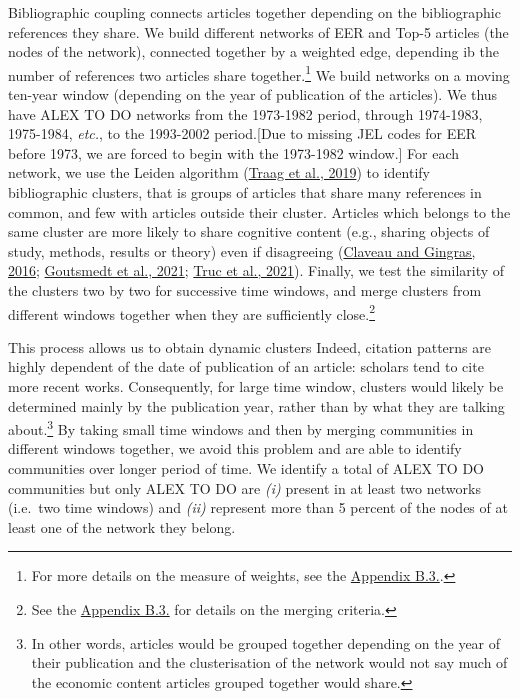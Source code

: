 \documentclass[]{elsarticle} %
\begin{document}
Bibliographic coupling connects articles together depending on the
bibliographic references they share. We build different networks of EER
and Top-5 articles (the nodes of the network), connected together by a
weighted edge, depending ib the number of references two articles share
together.\footnote{For more details on the measure of weights, see the
  \protect\hyperlink{network}{Appendix B.3.}.} We build networks on a
moving ten-year window (depending on the year of publication of the
articles). We thus have ALEX TO DO networks from the 1973-1982 period,
through 1974-1983, 1975-1984, \emph{etc.}, to the 1993-2002
period.{[}Due to missing JEL codes for EER before 1973, we are forced to
begin with the 1973-1982 window.{]} For each network, we use the Leiden
algorithm (\protect\hyperlink{ref-traag2019}{Traag et al., 2019}) to
identify bibliographic clusters, that is groups of articles that share
many references in common, and few with articles outside their cluster.
Articles which belongs to the same cluster are more likely to share
cognitive content (e.g., sharing objects of study, methods, results or
theory) even if disagreeing (\protect\hyperlink{ref-claveau2016}{Claveau
and Gingras, 2016}; \protect\hyperlink{ref-goutsmedt2021}{Goutsmedt et
al., 2021}; \protect\hyperlink{ref-truc2021}{Truc et al., 2021}).
Finally, we test the similarity of the clusters two by two for
successive time windows, and merge clusters from different windows
together when they are sufficiently close.\footnote{See the
  \protect\hyperlink{network}{Appendix B.3.} for details on the merging
  criteria.}

This process allows us to obtain dynamic clusters Indeed, citation
patterns are highly dependent of the date of publication of an article:
scholars tend to cite more recent works. Consequently, for large time
window, clusters would likely be determined mainly by the publication
year, rather than by what they are talking about.\footnote{In other
  words, articles would be grouped together depending on the year of
  their publication and the clusterisation of the network would not say
  much of the economic content articles grouped together would share.}
By taking small time windows and then by merging communities in
different windows together, we avoid this problem and are able to
identify communities over longer period of time. We identify a total of
ALEX TO DO communities but only ALEX TO DO are \emph{(i)} present in at
least two networks (i.e.~two time windows) and \emph{(ii)} represent
more than 5 percent of the nodes of at least one of the network they
belong.
\end{document}

